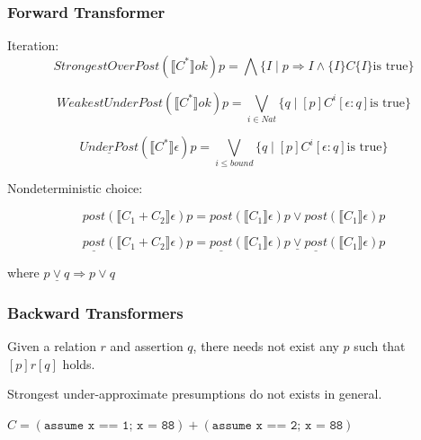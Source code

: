 \documentclass[11pt]{beamer}
\begin{document}
\begin{frame}\frametitle{Forward Transformer}
Iteration:
\[StrongestOverPost(\llbracket C^*\rrbracket ok)p = \bigwedge \{ I\mid p\Rightarrow I\wedge \{I\}C\{I\} \text{is true}\}\]

\[WeakestUnderPost(\llbracket C^*\rrbracket ok)p = \bigvee_{i\in Nat} \{q\mid [p]C^i[\epsilon:q] \text{is true}\}\]


\[\underline{UnderPost}(\llbracket C^*\rrbracket \epsilon)p = \bigvee_{i\le bound} \{q\mid [p]C^i[\epsilon:q] \text{is true}\}\]

Nondeterministic choice: 

\[post(\llbracket C_1 + C_2 \rrbracket \epsilon) p = post(\llbracket C_1 \rrbracket \epsilon) p \vee post(\llbracket C_1 \rrbracket \epsilon) p\]


\[\underline{post}(\llbracket C_1 + C_2 \rrbracket \epsilon) p = \underline{post}(\llbracket C_1 \rrbracket \epsilon) p \underline{\vee} \underline{post}(\llbracket C_1 \rrbracket \epsilon) p\]


where $p\underline{\vee}q \Rightarrow p\vee q$

\end{frame}

\begin{frame}\frametitle{Backward Transformers}
\begin{fact}
Given a relation $r$ and assertion $q$, there needs not exist any $p$ such that $[p]r[q]$ holds.

\end{fact}
Strongest under-approximate presumptions do not exists in general.

\begin{example}
$C = (\texttt{assume  x == 1; x = 88}) + (\texttt{assume  x == 2; x = 88})$

\end{example}
\end{frame}
\end{document}
